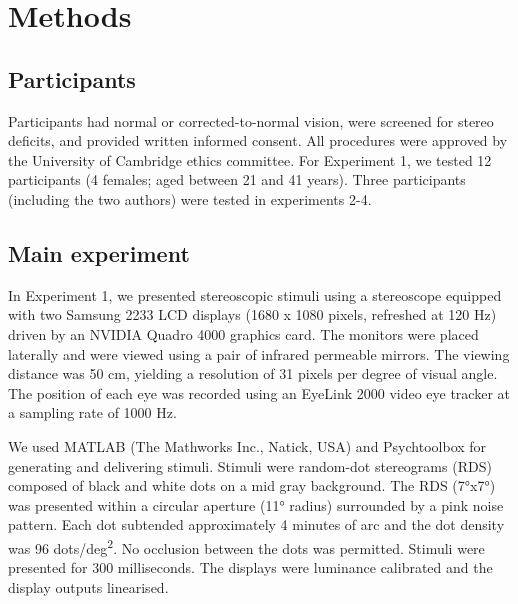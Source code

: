 \section{Methods}
\subsection{Participants}
Participants had normal or corrected-to-normal vision, were screened for stereo deficits, and provided written informed consent. All procedures were approved by the University of Cambridge ethics committee. For Experiment 1, we tested 12 participants (4 females; aged between 21 and 41 years). Three participants (including the two authors) were tested in experiments 2-4.

\subsection{Main experiment}
In Experiment 1, we presented stereoscopic stimuli using a stereoscope equipped with two Samsung 2233 LCD displays (1680 x 1080 pixels, refreshed at 120 Hz) driven by an NVIDIA Quadro 4000 graphics card. The monitors were placed laterally and were viewed using a pair of infrared permeable mirrors. The viewing distance was 50 cm, yielding a resolution of 31 pixels per degree of visual angle. The position of each eye was recorded using an EyeLink 2000 video eye tracker at a sampling rate of 1000 Hz.

We used MATLAB (The Mathworks Inc., Natick, USA) and Psychtoolbox \cite{Brainard:1997aa,Pelli:1997aa,kleiner2007s} for generating and delivering stimuli. Stimuli were random-dot stereograms (RDS) composed of black and white dots on a mid gray background. The RDS (\ang{7}x\ang{7}) was presented within a circular aperture (\ang{11} radius) surrounded by a pink noise pattern. Each dot subtended approximately 4 minutes of arc and the dot density was 96 dots/deg\textsuperscript{2}. No occlusion between the dots was permitted. Stimuli were presented for 300 milliseconds. The displays were luminance calibrated and the display outputs linearised.

